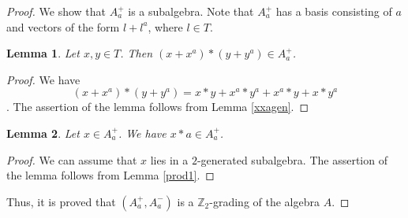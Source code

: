 \documentclass[10pt,a4paper]{amsart}
\newtheorem{lem}{Lemma}
\newcommand\Z{\mathbb{Z}}
\begin{document}
\begin{proof}
	 We show that $A_a^+$ is a subalgebra. Note that $A_a^+$ has a basis consisting of $a$ and vectors of the form $l+l^a$, where $l\in T$. 
	\begin{lem}\label{pp}
	 	Let $x,y\in T$. Then $(x+x^a)*(y+y^a)\in A^+_a$.
	\end{lem} 
	\begin{proof}
We have $$(x+x^a)*(y+y^a)=x*y+x^a*y^a+x^a*y+x*y^a$$.
The assertion of the lemma follows from Lemma \ref{xxagen}.
	\end{proof}

\begin{lem}\label{pa}
	Let $x\in A^+_a$. We have $x*a\in A^+_a$.
\end{lem}
\begin{proof}
We can assume that $x$ lies in a $2$-generated subalgebra. The assertion of the lemma follows from Lemma \ref{prod1}.
\end{proof}

Thus, it is proved that $(A^+_a,A^-_a)$ is a $\Z_2$-grading of the algebra $A$.
\end{proof}
\end{document}
